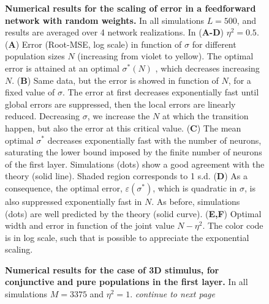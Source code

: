 \documentclass[a4paper]{article}
\begin{document}
\begin{figure}[p!]
\centering
{}
\caption{ \textbf{Numerical results for the scaling of error in a feedforward network with random weights.} In all simulations $L=500$, and results are averaged over 4 network realizations. In (\textbf{A-D})  $\eta^2 =0.5$. (\textbf{A}) Error (Root-MSE, log scale) in function of $\sigma$ for different population sizes $N$ (increasing from violet to yellow). The optimal error is attained at an optimal $\sigma^*(N)$ , which decreases increasing $N$. (\textbf{B}) Same data, but the error is showed in function of $N$, for a fixed value of $\sigma$. The error at first decreases exponentially fast until global errors are suppressed, then the local errors are linearly reduced. Decreasing $\sigma$, we increase the $N$ at which the transition happen, but also the error at this critical value.  (\textbf{C}) The mean optimal $\sigma^*$ decreases exponentially fast with the number of neurons, saturating the lower bound imposed by the finite number of neurons of the first layer. Simulations (dots) show a good agreement with the theory (solid line). Shaded region corresponds to 1 s.d. (\textbf{D}) As a consequence, the optimal error, $\varepsilon(\sigma^*)$, which is quadratic in $\sigma$,  is also suppressed exponentially fast in $N$. As before, simulations (dots) are well predicted by the theory (solid curve). (\textbf{E,F}) Optimal width and error in function of the joint value $N-\eta^2$. The color code is in log scale, such that is possible to appreciate the exponential scaling.
}
\label{Fig:4}
\end{figure}
\clearpage
\begin{figure}[p!]
\caption{\textbf{Numerical results for the case of 3D stimulus, for conjunctive and pure populations in the first layer.} In all simulations $M=3375$ and $\eta^2 =1$. \emph{continue to next page}}
\end{figure}
\end{document}
